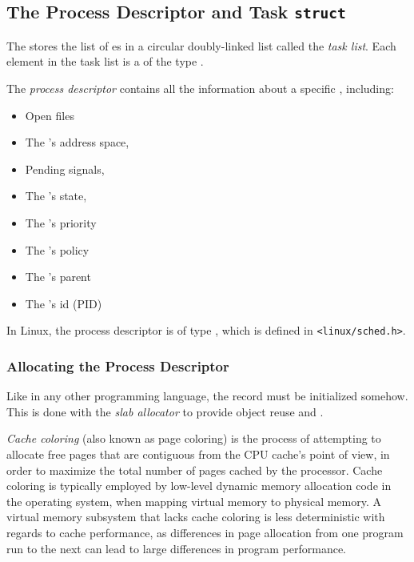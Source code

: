 \subsection{The Process Descriptor and Task \texttt{struct}}\label{subsec:Process_Descriptor_Task_Struct}
\begin{definition}\label{def:Task_List}
  The  stores the list of es in a circular doubly-linked list called the \emph{task list}.
  Each element in the task list is a  of the type .
\end{definition}

\begin{definition}\label{def:Process_Descriptor}
  The \emph{process descriptor} contains all the information about a specific , including:
  \begin{itemize}[noitemsep]
  \item Open files
  \item The ’s address space,
  \item Pending signals,
  \item The ’s state,
  \item The 's priority
  \item The 's policy
  \item The 's parent
  \item The 's id (PID)
  \end{itemize}

  In Linux, the process descriptor is of type , which is defined in \texttt{<linux/sched.h>}.
\end{definition}

\subsubsection{Allocating the Process Descriptor}\label{subsubsec:Allocate_Process_Descriptor}
Like in any other programming language, the  record must be initialized somehow.
This is done with the \emph{slab allocator} to provide object reuse and .

\begin{definition}\label{def:Cache_Coloring}
  \emph{Cache coloring} (also known as page coloring) is the process of attempting to allocate free pages that are contiguous from the CPU cache's point of view, in order to maximize the total number of pages cached by the processor.
  Cache coloring is typically employed by low-level dynamic memory allocation code in the operating system, when mapping virtual memory to physical memory.
  A virtual memory subsystem that lacks cache coloring is less deterministic with regards to cache performance, as differences in page allocation from one program run to the next can lead to large differences in program performance.
\end{definition}

